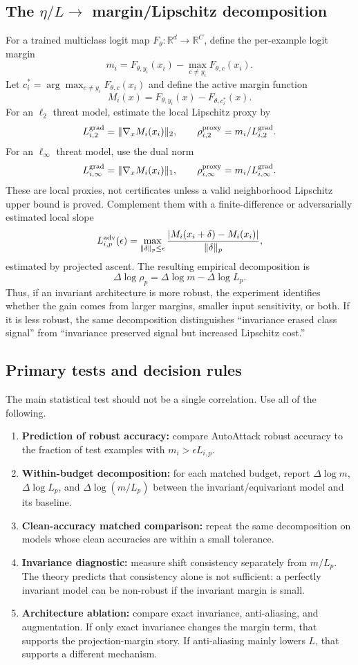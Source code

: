 \documentclass[11pt]{article}
\theoremstyle{plain}
\theoremstyle{definition}
\theoremstyle{remark}
\newcommand{\R}{\mathbb{R}}
\begin{document}
\subsection{The $\eta/L\to$ margin/Lipschitz decomposition}
For a trained multiclass logit map $F_\theta:\R^d\to\R^C$, define the per-example logit margin
\[
 m_i = F_{\theta,y_i}(x_i)-\max_{c\ne y_i}F_{\theta,c}(x_i).
\]
Let $c_i^*=\arg\max_{c\ne y_i}F_{\theta,c}(x_i)$ and define the active margin function
\[
 M_i(x)=F_{\theta,y_i}(x)-F_{\theta,c_i^*}(x).
\]
For an $\ell_2$ threat model, estimate the local Lipschitz proxy by
\[
 L_{i,2}^{\rm grad}=\|\nabla_x M_i(x_i)\|_2,
\qquad
 \rho_{i,2}^{\rm proxy}=m_i/L_{i,2}^{\rm grad}.
\]
For an $\ell_\infty$ threat model, use the dual norm
\[
 L_{i,\infty}^{\rm grad}=\|\nabla_x M_i(x_i)\|_1,
\qquad
 \rho_{i,\infty}^{\rm proxy}=m_i/L_{i,\infty}^{\rm grad}.
\]
These are local proxies, not certificates unless a valid neighborhood Lipschitz upper bound is proved.  Complement them with a finite-difference or adversarially estimated local slope
\[
 L_{i,p}^{\rm adv}(\epsilon)=\max_{\|\delta\|_p\le\epsilon}
 \frac{|M_i(x_i+\delta)-M_i(x_i)|}{\|\delta\|_p},
\]
estimated by projected ascent.  The resulting empirical decomposition is
\[
 \Delta\log \rho_p
 =\Delta\log m - \Delta\log L_p.
\]
Thus, if an invariant architecture is more robust, the experiment identifies whether the gain comes from larger margins, smaller input sensitivity, or both.  If it is less robust, the same decomposition distinguishes ``invariance erased class signal'' from ``invariance preserved signal but increased Lipschitz cost.''

\subsection{Primary tests and decision rules}
The main statistical test should not be a single correlation.  Use all of the following.
\begin{enumerate}[leftmargin=1.4em]
\item \textbf{Prediction of robust accuracy:} compare AutoAttack robust accuracy to the fraction of test examples with $m_i>\epsilon L_{i,p}$.
\item \textbf{Within-budget decomposition:} for each matched budget, report $\Delta\log m$, $\Delta\log L_p$, and $\Delta\log(m/L_p)$ between the invariant/equivariant model and its baseline.
\item \textbf{Clean-accuracy matched comparison:} repeat the same decomposition on models whose clean accuracies are within a small tolerance.
\item \textbf{Invariance diagnostic:} measure shift consistency separately from $m/L_p$.  The theory predicts that consistency alone is not sufficient: a perfectly invariant model can be non-robust if the invariant margin is small.
\item \textbf{Architecture ablation:} compare exact invariance, anti-aliasing, and augmentation.  If only exact invariance changes the margin term, that supports the projection-margin story.  If anti-aliasing mainly lowers $L$, that supports a different mechanism.
\end{enumerate}
\end{document}

